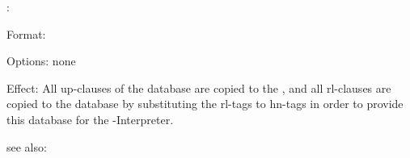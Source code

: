 :

Format: 

Options: none

Effect: All up-clauses of the database  are copied to the 
	, and all rl-clauses are copied to the database 
	 by substituting the rl-tags to hn-tags in order to provide
	this database for the \RELFUN{}-Interpreter. 

see also: 
